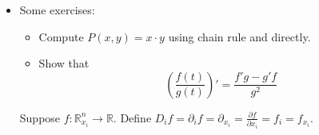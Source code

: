 \begin{itemize}
\begin{proof}
\begin{align}
\begin{pmatrix}
            \end{pmatrix} \\ 
            &= \begin{pmatrix}
                f_1'(a)\cdot h + e_1(h) \\ 
                \vdots \\ 
                f_m'(a) \cdot h + e_m(h)
            \end{pmatrix} \\ 
            &= \begin{pmatrix}
                f_1'(a) \\ \vdots \\ f_m'(a)
            \end{pmatrix}\cdot h + \begin{pmatrix}
                e_1(h) \\ \vdots \\ e_m(h)
            \end{pmatrix}
        \end{align}
        All that remains to show is that a column vector consisting of tiny functions is itself a tiny function. Finally, the other implication is easy.
    \end{proof}
    \item Some exercises: 
    \begin{itemize}
        \item Compute $P(x,y) = x\cdot y$ using chain rule and directly.
        \item Show that 
        \begin{equation}
            \left(\frac{f(t)}{g(t)}\right)' = \frac{f'g-g'f}{g^2}
        \end{equation}
    \end{itemize}
    \begin{definition}
        Suppose $f:\mathbb{R}^n_{x_i}\rightarrow \mathbb{R}.$ Define $D_if = \partial_i f = \partial_{x_i} = \frac{\partial f}{\partial x_i} = f_i = f_{x_i}.$
    \end{definition}
\end{itemize}